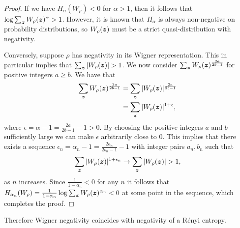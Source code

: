 \documentclass[pra,
aps,
twocolumn,
superscriptaddress,
groupedaddress,
nofootinbib,
reprint
]{revtex4-1}
\begin{document}
\addtocounter{theorem}{-1}
\endgroup
\begin{proof} 
If we have $H_\alpha (W_\rho) <0 $ for $\alpha >1$, then it follows that $\log \sum_{\bm{z}} W_\rho (\bm{z})^\alpha > 1$. 
However, it is known that $H_\alpha$ is always non-negative on probability distributions, so $W_\rho(\bm{z})$ must be a strict quasi-distribution with negativity.

Conversely, suppose $\rho$ has negativity in its Wigner representation. This in particular implies that $\sum_{\bm{z}} |W_\rho (\bm{z})| >1$. We now consider $\sum_{\bm{z}} W_\rho (\bm{z})^{\frac{2a}{2b-1}}$ for positive integers $a\ge b$. We have that
\begin{align}
\sum_{\bm{z}} W_\rho (\bm{z})^{\frac{2a}{2b-1}} &= \sum_{\bm{z}} |W_\rho (\bm{z})|^{\frac{2a}{2b-1}} \nonumber \\
&= \sum_{\bm{z}} |W_\rho (\bm{z})|^{1+ \epsilon},
\end{align}
where $\epsilon = \alpha -1=\frac{2a}{2b-1} - 1 >0$. By choosing the positive integers $a$ and $b$ sufficiently large we can make $\epsilon$ arbitrarily close to $0$. This implies that there exists a sequence $\epsilon_n= \alpha_n-1 =\frac{2a_n}{2b_n-1} - 1$ with integer pairs $a_n, b_n$ such that
\begin{equation}
\sum_{\bm{z}} |W_\rho (\bm{z})|^{1+ \epsilon_n} \rightarrow \sum_{\bm{z}} |W_\rho (\bm{z})| >1,
\end{equation}
as $n$ increases.
Since $\frac{1}{1-\alpha_n} <0$ for any $n$ it follows that $H_{\alpha_n} (W_\rho) = \frac{1}{1-\alpha_n} \log \sum_{\bm{z}} W_\rho (\bm{z})^{\alpha_n}  <0 $ at some point in the sequence, which completes the proof.
\end{proof}
Therefore Wigner negativity coincides with negativity of a R\'{e}nyi entropy.
\end{document}
